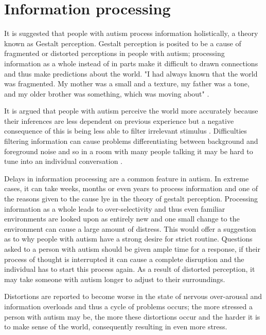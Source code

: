 \documentclass[11pt]{report}
\begin{document}
\section{Information processing}

It is suggested that people with autism process information holistically, a theory known as Gestalt perception. Gestalt perception is posited to be a cause of fragmented or distorted perceptions in people with autism\cite{olgab}; processing information as a whole instead of in parts make it difficult to drawn connections and thus make predictions about the world. "I had always known that the world was fragmented. My mother was a small and a texture, my father was a tone, and my older brother was something, which was moving about" \cite{williams1992}. 

It is argued that people with autism perceive the world more accurately because their inferences are less dependent on previous experience but a negative consequence of this is being less able to filter irrelevant stimulus \cite{bayes}. Difficulties filtering information can cause problems differentiating between background and foreground noise and so in a room with many people talking it may be hard to tune into an individual conversation \cite{bayes}. 

Delays in information processing are a common feature in autism. In extreme cases, it can take weeks, months or even years to process information and one of the reasons given to the cause lye in the theory of gestalt perception. Processing information as a whole leads to over-selectivity and thus even familiar environments are looked upon as entirely new and one small change to the environment can cause a large amount of distress\cite{olgab}. This would offer a suggestion as to why people with autism have a strong desire for strict routine. Questions asked to a person with autism should be given ample time for a response, if their process of thought is interrupted it can cause a complete disruption and the individual has to start this process again\cite{olgab}. As a result of distorted perception, it may take someone with autism longer to adjust to their surroundings. 

Distortions are reported to become worse in the state of nervous over-arousal and information overloads\cite{olgab} and thus a cycle of problems occurs; the more stressed a person with autism may be, the more these distortions occur and the harder it is to make sense of the world, consequently resulting in even more stress.
\end{document}
